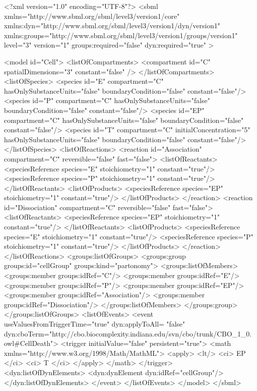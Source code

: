 \begin{example}
<?xml version="1.0" encoding="UTF-8"?>
<sbml xmlns="http://www.sbml.org/sbml/level3/version1/core" 
      xmlns:dyn="http://www.sbml.org/sbml/level3/version1/dyn/version1" 
      xmlns:groups="http://www.sbml.org/sbml/level3/version1/groups/version1"
      level="3" version="1" groups:required="false" dyn:required="true" >

	<model id="Cell">
		<listOfCompartments>
			<compartment id="C" spatialDimensions="3" constant="false" />
		</listOfCompartments>
		<listOfSpecies>
			<species id="E" compartment="C" hasOnlySubstanceUnits="false" 
			         boundaryCondition="false" constant="false"/>
			<species id="P" compartment="C" hasOnlySubstanceUnits="false" 
			         boundaryCondition="false" constant="false"/>
			<species id="EP" compartment="C" hasOnlySubstanceUnits="false" 
			         boundaryCondition="false" constant="false"/>
			<species id="T" compartment="C" initialConcentration="5" hasOnlySubstanceUnits="false" 
                boundaryCondition="false" constant="false"/>
		</listOfSpecies>
		<listOfReactions>
			<reaction id="Association" compartment="C" reversible="false" fast="false">
				<listOfReactants>
					<speciesReference species="E" stoichiometry="1" constant="true"/>
					<speciesReference species="P" stoichiometry="1" constant="true"/>
				</listOfReactants>
				<listOfProducts>
					<speciesReference species="EP" stoichiometry="1" constant="true"/>
				</listOfProducts>
			</reaction>
			<reaction id="Dissociation" compartment="C" reversible="false" fast="false">
				<listOfReactants>
					<speciesReference species="EP" stoichiometry="1" constant="true"/>
				</listOfReactants>
				<listOfProducts>
					<speciesReference species="E" stoichiometry="1" constant="true"/>
					<speciesReference species="P" stoichiometry="1" constant="true"/>
				</listOfProducts>
			</reaction>
		</listOfReactions>
		<groups:listOfGroups>
			<groups:group groups:id="cellGroup" groups:kind="partonomy">
				<groups:listOfMembers>
					<groups:member groups:idRef="C"/>
					<groups:member groups:idRef="E"/>
					<groups:member groups:idRef="P"/>
					<groups:member groups:idRef="EP"/>
					<groups:member groups:idRef="Association"/>
					<groups:member groups:idRef="Dissociation"/>
				</groups:listOfMembers>
			</groups:group>	
		</groups:listOfGroups>
		<listOfEvents>
			<event useValuesFromTriggerTime="true" dyn:applyToAll= "false" 
			dyn:cboTerm="http://cbo.biocomplexity.indiana.edu/svn/cbo/trunk/CBO_1_0.owl#CellDeath">
				<trigger initialValue="false" persistent="true">
					<math xmlns="http://www.w3.org/1998/Math/MathML">
						<apply> <lt/> <ci> EP </ci> <ci> T </ci> </apply>
					</math>
				</trigger>
				<dyn:listOfDynElements>
					<dyn:dynElement dyn:idRef="cellGroup"/>
				</dyn:listOfDynElements>
			</event>
		</listOfEvents>
	</model>
</sbml>
\end{example}

